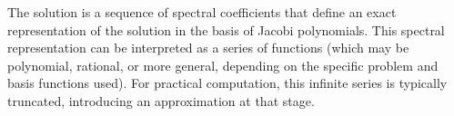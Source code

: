 \documentclass{article}
\begin{document}
The solution is a sequence of spectral coefficients that define an exact representation of the solution in the basis of Jacobi polynomials. This spectral representation can be interpreted as a series of functions (which may be polynomial, rational, or more general, depending on the specific problem and basis functions used). For practical computation, this infinite series is typically truncated, introducing an approximation at that stage.
\end{document}
